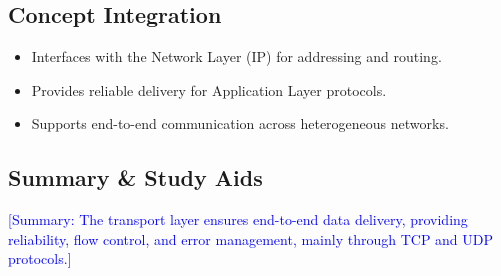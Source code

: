 \documentclass[12pt]{article}
\begin{document}
\subsection{Concept Integration}
\begin{itemize}
    \item Interfaces with the Network Layer (IP) for addressing and routing.
    \item Provides reliable delivery for Application Layer protocols.
    \item Supports end-to-end communication across heterogeneous networks.
\end{itemize}

\subsection{Summary \& Study Aids}
\textcolor{blue}{[Summary: The transport layer ensures end-to-end data delivery, providing reliability, flow control, and error management, mainly through TCP and UDP protocols.]}

\end{document}
